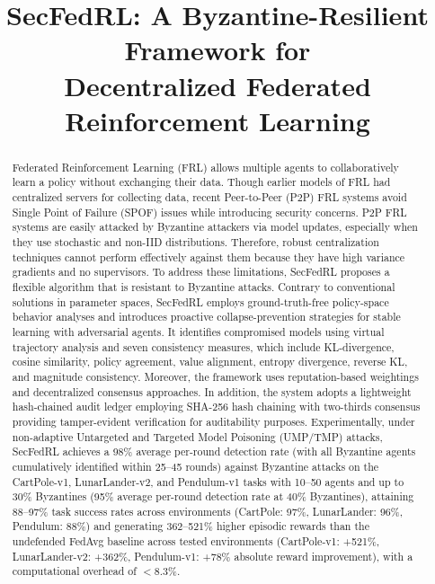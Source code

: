 \documentclass[12pt,a4paper]{article}
\title{\textbf{SecFedRL: A Byzantine-Resilient Framework for\\
Decentralized Federated Reinforcement Learning}}
\author{}
\date{}
\begin{document}
\maketitle
\thispagestyle{empty}

\begin{abstract}
Federated Reinforcement Learning (FRL) allows multiple agents to collaboratively learn
a policy without exchanging their data. Though earlier models of FRL had centralized
servers for collecting data, recent Peer-to-Peer (P2P) FRL systems avoid Single Point of
Failure (SPOF) issues while introducing security concerns. P2P FRL systems are easily
attacked by Byzantine attackers via model updates, especially when they use stochastic
and non-IID distributions. Therefore, robust centralization techniques cannot perform
effectively against them because they have high variance gradients and no supervisors.
To address these limitations, SecFedRL proposes a flexible algorithm that is resistant
to Byzantine attacks. Contrary to conventional solutions in parameter spaces, SecFedRL
employs ground-truth-free policy-space behavior analyses and introduces proactive
collapse-prevention strategies for stable learning with adversarial agents. It identifies
compromised models using virtual trajectory analysis and seven consistency measures,
which include KL-divergence, cosine similarity, policy agreement, value alignment,
entropy divergence, reverse KL, and magnitude consistency. Moreover, the framework uses
reputation-based weightings and decentralized consensus approaches. In addition, the
system adopts a lightweight hash-chained audit ledger employing SHA-256 hash chaining
with two-thirds consensus providing tamper-evident verification for auditability purposes.
Experimentally, under non-adaptive Untargeted and Targeted Model Poisoning (UMP/TMP)
attacks, SecFedRL achieves a 98\% average per-round detection rate (with all Byzantine agents
cumulatively identified within 25--45 rounds)
against Byzantine attacks on the CartPole-v1, LunarLander-v2, and Pendulum-v1 tasks with
10--50 agents and up to 30\% Byzantines (95\% average per-round detection rate at 40\%
Byzantines), attaining 88--97\% task success rates across environments (CartPole: 97\%,
LunarLander: 96\%, Pendulum: 88\%) and generating 362--521\% higher episodic rewards than
the undefended FedAvg baseline across tested environments (CartPole-v1: +521\%,
LunarLander-v2: +362\%, Pendulum-v1: +78\% absolute reward improvement), with a
computational overhead of ${<}8.3\%$.
\end{abstract}
\end{document}
